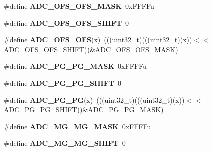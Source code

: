 \begin{DoxyCompactItemize}
\mbox{\label{group___a_d_c___register___masks_ga1532ae43eb63d6c071f531cca89fdb68}} 
\#define {\bfseries A\+D\+C\+\_\+\+O\+F\+S\+\_\+\+O\+F\+S\+\_\+\+M\+A\+SK}~0x\+F\+F\+F\+Fu
\item 
\mbox{\label{group___a_d_c___register___masks_ga86de5d25a5433db6e96700e2d000ad07}} 
\#define {\bfseries A\+D\+C\+\_\+\+O\+F\+S\+\_\+\+O\+F\+S\+\_\+\+S\+H\+I\+FT}~0
\item 
\mbox{\label{group___a_d_c___register___masks_gad48888faa6b880f4011253b53413f37b}} 
\#define {\bfseries A\+D\+C\+\_\+\+O\+F\+S\+\_\+\+O\+FS}(x)~(((uint32\+\_\+t)(((uint32\+\_\+t)(x))$<$$<$A\+D\+C\+\_\+\+O\+F\+S\+\_\+\+O\+F\+S\+\_\+\+S\+H\+I\+FT))\&A\+D\+C\+\_\+\+O\+F\+S\+\_\+\+O\+F\+S\+\_\+\+M\+A\+SK)
\item 
\mbox{\label{group___a_d_c___register___masks_ga0619279d8dcf43af1fda9f27090ae51b}} 
\#define {\bfseries A\+D\+C\+\_\+\+P\+G\+\_\+\+P\+G\+\_\+\+M\+A\+SK}~0x\+F\+F\+F\+Fu
\item 
\mbox{\label{group___a_d_c___register___masks_ga014623fb35c473d12ff7fc64c3e8cfe3}} 
\#define {\bfseries A\+D\+C\+\_\+\+P\+G\+\_\+\+P\+G\+\_\+\+S\+H\+I\+FT}~0
\item 
\mbox{\label{group___a_d_c___register___masks_ga4b6bf1c895aa431e08bed733de13e71e}} 
\#define {\bfseries A\+D\+C\+\_\+\+P\+G\+\_\+\+PG}(x)~(((uint32\+\_\+t)(((uint32\+\_\+t)(x))$<$$<$A\+D\+C\+\_\+\+P\+G\+\_\+\+P\+G\+\_\+\+S\+H\+I\+FT))\&A\+D\+C\+\_\+\+P\+G\+\_\+\+P\+G\+\_\+\+M\+A\+SK)
\item 
\mbox{\label{group___a_d_c___register___masks_ga9f415258af1bad0159dd605efccd043b}} 
\#define {\bfseries A\+D\+C\+\_\+\+M\+G\+\_\+\+M\+G\+\_\+\+M\+A\+SK}~0x\+F\+F\+F\+Fu
\item 
\mbox{\label{group___a_d_c___register___masks_ga4b2717da089f0de5bd41ef91001b7cfe}} 
\#define {\bfseries A\+D\+C\+\_\+\+M\+G\+\_\+\+M\+G\+\_\+\+S\+H\+I\+FT}~0
\item 

\end{DoxyCompactItemize}
